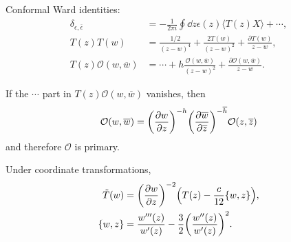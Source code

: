 \documentclass{article}
\begin{document}
Conformal Ward identities:
\begin{align*}
    \delta_{\epsilon,\overline{\epsilon}} &= -\frac{1}{2\pi i} \oint \dd{z} \epsilon(z)\langle T(z)X\rangle + \cdots, \\
    T(z) T(w) &= \frac{1/2}{(z-w)^4} + \frac{2T(w)}{(z-w)^2} + \frac{\partial T(w)}{z-w}, \\
    T(z) \mathcal{O}(w,\overline{w}) &= \cdots + h \frac{\mathcal{O}(w,\overline{w})}{(z-w)^2} + \frac{\partial \mathcal{O}(w,\overline{w})}{z-w}.
\end{align*}

If the $\cdots$ part in $T(z)\mathcal{O}(w,\overline{w})$ vanishes, then
\[ \mathcal{O}(w,\overline{w}) = \qty(\pdv{w}{z})^{-h}\qty(\pdv{\overline{w}}{\overline{z}})^{-\overline{h}} \mathcal{O}(z,\overline{z}) \]
and therefore $\mathcal{O}$ is primary.
\par
Under coordinate transformations,
\begin{align*}
    \tilde{T}(w) &= \qty(\pdv{w}{z})^{-2}\qty(T(z) - \frac{c}{12}\qty{w,z}), \\
    \qty{w,z} &= \frac{w'''(z)}{w'(z)} - \frac{3}{2}\qty(\frac{w''(z)}{w'(z)})^2.
\end{align*}

% 
% 
\end{document}
